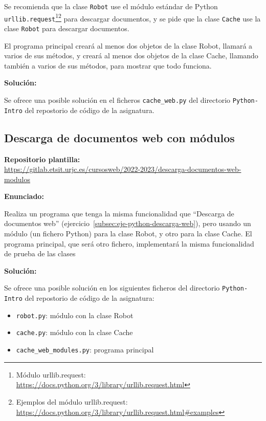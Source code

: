 Se recomienda que la clase \verb|Robot| use el módulo estándar de Python \verb|urllib.request|\footnote{Módulo urllib.request: \\ \url{https://docs.python.org/3/library/urllib.request.html}}\footnote{Ejemplos del módulo urllib.request: \\ \url{https://docs.python.org/3/library/urllib.request.html\#examples}} para descargar documentos, y se pide que la clase \verb|Cache| use la clase \verb|Robot| para descargar documentos.

El programa principal creará al menos dos objetos de la clase Robot, llamará a varios de sus métodos, y creará al menos dos objetos de la clase Cache, llamando también a varios de sus métodos, para mostrar que todo funciona.

\textbf{Solución:}

Se ofrece una posible solución en el ficheros \verb|cache_web.py| del directorio \verb|Python-Intro| del repostorio de código de la asignatura.


\subsection{Descarga de documentos web con módulos}
\label{subsec:eje-python-descarga-web-modulos}

\textbf{Repositorio plantilla:} \\
\url{https://gitlab.etsit.urjc.es/cursosweb/2022-2023/descarga-documentos-web-modulos}

\textbf{Enunciado:}

Realiza un programa que tenga la misma funcionalidad que ``Descarga de documentos web'' (ejercicio~\ref{subsec:eje-python-descarga-web}), pero usando un módulo (un fichero Python) para la clase Robot, y otro para la clase Cache. El programa principal, que será otro fichero, implementará la misma funcionalidad de prueba de las clases

\textbf{Solución:}

Se ofrece una posible solución en los siguientes ficheros del directorio \verb|Python-Intro| del repostorio de código de la asignatura:

\begin{itemize}
\item \verb|robot.py|: módulo con la clase Robot
\item \verb|cache.py|: módulo con la clase Cache
\item \verb|cache_web_modules.py|: programa principal
\end{itemize}

